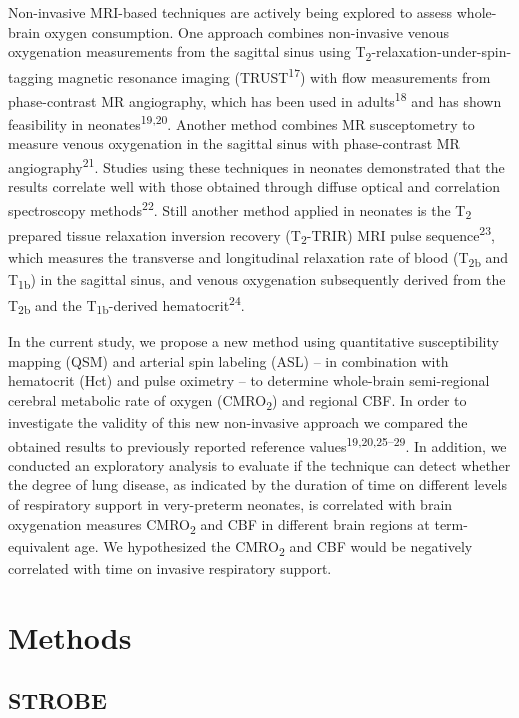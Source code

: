 \documentclass[
  letterpaper,
  DIV=11,
  numbers=noendperiod]{scrartcl}
\begin{document}
Non-invasive MRI-based techniques are actively being explored to assess
whole-brain oxygen consumption. One approach combines non-invasive
venous oxygenation measurements from the sagittal sinus using
T\textsubscript{2}-relaxation-under-spin-tagging magnetic resonance
imaging (TRUST\textsuperscript{17}) with flow measurements from
phase-contrast MR angiography, which has been used in
adults\textsuperscript{18} and has shown feasibility in
neonates\textsuperscript{19,20}. Another method combines MR
susceptometry to measure venous oxygenation in the sagittal sinus with
phase-contrast MR angiography\textsuperscript{21}. Studies using these
techniques in neonates demonstrated that the results correlate well with
those obtained through diffuse optical and correlation spectroscopy
methods\textsuperscript{22}. Still another method applied in neonates is
the T\textsubscript{2} prepared tissue relaxation inversion recovery
(T\textsubscript{2}-TRIR) MRI pulse sequence\textsuperscript{23}, which
measures the transverse and longitudinal relaxation rate of blood
(T\textsubscript{2b} and T\textsubscript{1b}) in the sagittal sinus, and
venous oxygenation subsequently derived from the T\textsubscript{2b} and
the T\textsubscript{1b}-derived hematocrit\textsuperscript{24}.

In the current study, we propose a new method using quantitative
susceptibility mapping (QSM) and arterial spin labeling (ASL) -- in
combination with hematocrit (Hct) and pulse oximetry -- to determine
whole-brain semi-regional cerebral metabolic rate of oxygen
(CMRO\textsubscript{2}) and regional CBF. In order to investigate the
validity of this new non-invasive approach we compared the obtained
results to previously reported reference
values\textsuperscript{19,20,25--29}. In addition, we conducted an
exploratory analysis to evaluate if the technique can detect whether the
degree of lung disease, as indicated by the duration of time on
different levels of respiratory support in very-preterm neonates, is
correlated with brain oxygenation measures CMRO\textsubscript{2} and CBF
in different brain regions at term-equivalent age. We hypothesized the
CMRO\textsubscript{2} and CBF would be negatively correlated with time
on invasive respiratory support.

\section{Methods}\label{methods}

\subsection{STROBE}\label{strobe}
\end{document}
